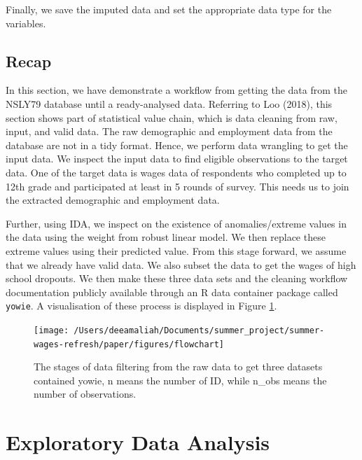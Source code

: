 \documentclass{article}
\begin{document}
Finally, we save the imputed data and set the appropriate data type for the variables.

\hypertarget{recap}{%
\subsection{Recap}\label{recap}}

In this section, we have demonstrate a workflow from getting the data from the NSLY79 database until a ready-analysed data. Referring to Loo (2018), this section shows part of statistical value chain, which is data cleaning from raw, input, and valid data. The raw demographic and employment data from the database are not in a tidy format. Hence, we perform data wrangling to get the input data. We inspect the input data to find eligible observations to the target data. One of the target data is wages data of respondents who completed up to 12th grade and participated at least in 5 rounds of survey. This needs us to join the extracted demographic and employment data.

Further, using IDA, we inspect on the existence of anomalies/extreme values in the data using the weight from robust linear model. We then replace these extreme values using their predicted value.
From this stage forward, we assume that we already have valid data. We also subset the data to get the wages of high school dropouts. We then make these three data sets and the cleaning workflow documentation publicly available through an R data container package called \texttt{yowie}. A visualisation of these process is displayed in Figure \ref{fig:flow-chart}.

\begin{figure}

{\centering \texttt{[image: /Users/deeamaliah/Documents/summer\_project/summer-wages-refresh/paper/figures/flowchart]} 

}

\caption{The stages of data filtering from the raw data to get three datasets contained yowie, n means the number of ID, while n\_obs means the number of observations.}\label{fig:flow-chart}
\end{figure}

\hypertarget{exploratory-data-analysis}{%
\section{Exploratory Data Analysis}\label{exploratory-data-analysis}}
\end{document}
